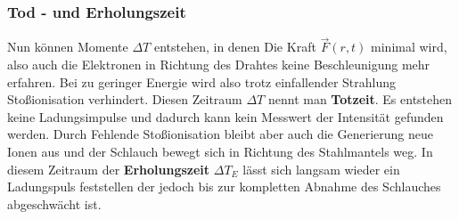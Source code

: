 \subsubsection{Tod - und Erholungszeit}
Nun können Momente $\Delta T$ entstehen, in denen Die Kraft $\vec{F}(r,t)$ minimal wird, also auch die Elektronen in Richtung des Drahtes keine Beschleunigung mehr erfahren. 
Bei zu geringer Energie wird also trotz einfallender Strahlung Stoßionisation verhindert. Diesen Zeitraum $\Delta T$ nennt man \textbf{Totzeit}. Es entstehen keine Ladungsimpulse und dadurch kann kein Messwert der Intensität gefunden werden.
Durch Fehlende Stoßionisation bleibt aber auch die Generierung neue Ionen aus und der Schlauch bewegt sich in Richtung des Stahlmantels weg. 
In diesem Zeitraum der \textbf{Erholungszeit} $\Delta T_E$ lässt sich langsam wieder ein Ladungspuls feststellen der jedoch bis zur kompletten Abnahme des Schlauches abgeschwächt ist.

